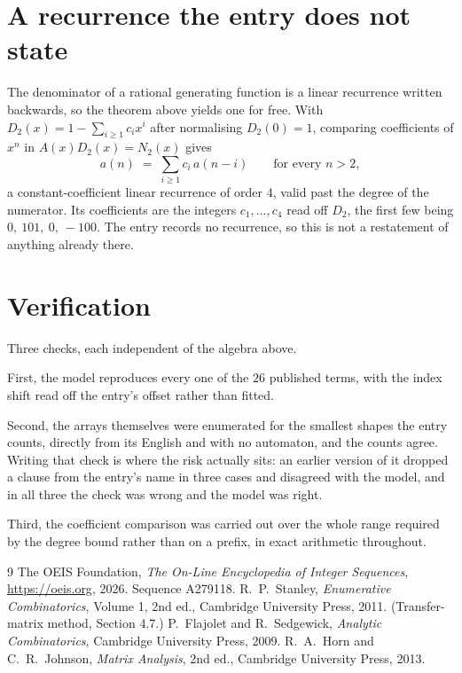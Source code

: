 \documentclass[11pt,a4paper]{article}
\theoremstyle{plain}
\theoremstyle{definition}
\begin{document}
\section{A recurrence the entry does not state}

The denominator of a rational generating function is a linear recurrence written backwards, so
the theorem above yields one for free. With $D_2(x)=1-\sum_{i\ge1}c_ix^i$ after normalising
$D_2(0)=1$, comparing coefficients of $x^n$ in $A(x)D_2(x)=N_2(x)$ gives
\[
a(n)\;=\;\sum_{i\ge1}c_i\,a(n-i)\qquad\text{for every }n>2,
\]
a constant-coefficient linear recurrence of order $4$, valid past the degree of the
numerator. Its coefficients are the integers $c_1,\dots,c_{4}$ read off $D_2$, the first few being $0,\ 101,\ 0,\ -100$. The entry records no recurrence, so this is not a restatement of anything
already there.

\section{Verification}

Three checks, each independent of the algebra above.

First, the model reproduces every one of the $26$ published terms, with the index shift
read off the entry's offset rather than fitted.

Second, the arrays themselves were enumerated for the smallest shapes the entry counts,
directly from its English and with no automaton, and the counts agree. Writing that check is
where the risk actually sits: an earlier version of it dropped a clause from the entry's name
in three cases and disagreed with the model, and in all three the check was wrong and the model
was right.

Third, the coefficient comparison was carried out over the whole range required by the degree
bound rather than on a prefix, in exact arithmetic throughout.

\begin{thebibliography}{9}
 The OEIS Foundation, \emph{The On-Line Encyclopedia of Integer
Sequences}, \url{https://oeis.org}, 2026. Sequence A279118.
 R.~P.~Stanley, \emph{Enumerative Combinatorics}, Volume 1, 2nd ed.,
Cambridge University Press, 2011. (Transfer-matrix method, Section 4.7.)
 P.~Flajolet and R.~Sedgewick, \emph{Analytic Combinatorics}, Cambridge
University Press, 2009.
 R.~A.~Horn and C.~R.~Johnson, \emph{Matrix Analysis}, 2nd ed., Cambridge
University Press, 2013.
\end{thebibliography}
\end{document}
